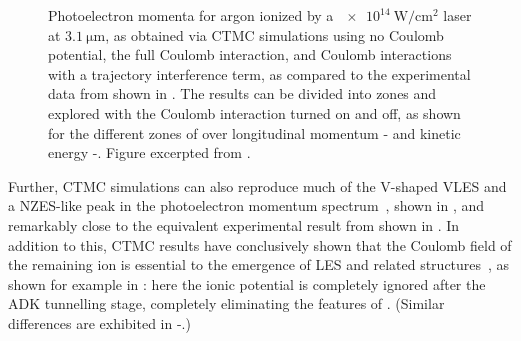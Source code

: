 \begin{figure}[hb]
\begin{tabular}{ccc}
  \end{tabular}
  \caption[
  CTMC simulations of VLES V-shaped structure and NZES-like peak, performed by Q.Z. Xia et al.
  ]{
  Photoelectron momenta for argon ionized by a $\SI{e14}{\watt/\centi\meter^2}$ laser at $\SI{3.1}{\micro\meter}$, as obtained via CTMC simulations using \protect{} no Coulomb potential, \protect{} the full Coulomb interaction, and \protect{} Coulomb interactions with a trajectory interference term, as compared to the experimental data from  shown in \protect{}. The results can be divided into zones and explored with the Coulomb interaction turned on and off, as shown for the different zones of \protect{} over longitudinal momentum \protect{}-\protect{} and kinetic energy \protect{}-\protect{}.
  Figure excerpted from .
  }
\label{f6-xia-original-figure}
\end{figure}



Further, CTMC simulations can also reproduce much of the V-shaped VLES and a NZES-like peak in the photoelectron momentum spectrum~\cite{xia_near-zero-energy_2015}, shown in , and remarkably close to the equivalent experimental result from  shown in . In addition to this, CTMC results have conclusively shown that the Coulomb field of the remaining ion is essential to the emergence of LES and related structures~\cite{zhi_Coulomb-LES_2014, xia_near-zero-energy_2015}, as shown for example in : here the ionic potential is completely ignored after the ADK tunnelling stage, completely eliminating the features of . (Similar differences are exhibited in -.)



